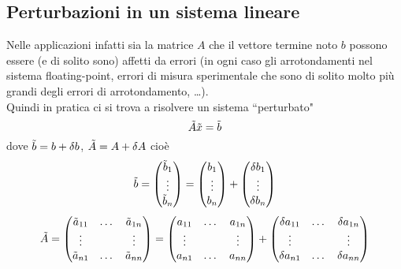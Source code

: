 \documentclass[12pt,a4paper]{article}
\begin{document}
\subsection{Perturbazioni in un sistema lineare}
Nelle applicazioni infatti sia la matrice $A$ che il vettore termine noto $b$ possono essere (e di solito sono) affetti da errori (in ogni caso gli arrotondamenti nel sistema floating-point, errori di misura sperimentale che sono di solito molto più grandi degli errori di arrotondamento, \dots).\\
Quindi in pratica ci si trova a risolvere un sistema ``perturbato"
\begin{equation*}
    \Tilde{A}\Tilde{x}=\Tilde{b}
\end{equation*}
dove $\Tilde{b}=b+\delta b$, $\Tilde{A}=A+\delta A$ cioè
\begin{equation*}
    \Tilde{b}= 
    \begin{pmatrix}
    \Tilde{b}_1\\  
    \vdots\\ 
    \Tilde{b}_n
\end{pmatrix} =
\begin{pmatrix}
    b_1\\  
    \vdots\\ 
    b_n
\end{pmatrix} + 
\begin{pmatrix}
    \delta b_1\\  
    \vdots\\ 
    \delta b_n
\end{pmatrix}
\end{equation*}
\begin{equation*}
    \Tilde{A} =
    \begin{pmatrix}
        \Tilde{a}_{11} & \dots & \Tilde{a}_{1n} \\
        \vdots & & \vdots \\
        \Tilde{a}_{n1} & \dots & \Tilde{a}_{nn}
    \end{pmatrix} = 
    \begin{pmatrix}
        a_{11} & \dots & a_{1n} \\
        \vdots & & \vdots  \\
        a_{n1} & \dots & a_{nn}
    \end{pmatrix} +
    \begin{pmatrix}
        \delta a_{11} & \dots & \delta a_{1n} \\
        \vdots & & \vdots \\
        \delta a_{n1} & \dots & \delta a_{nn}
    \end{pmatrix}
\end{equation*}
\end{document}
